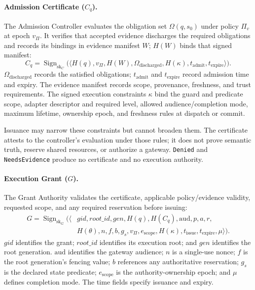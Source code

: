 \paragraph{Admission Certificate ($C_q$).}
The Admission Controller evaluates the obligation set $\Omega(q,s_0)$ under policy $\Pi_v$ at epoch $v_{\Pi}$. It verifies that accepted evidence discharges the required obligations and records its bindings in evidence manifest $W$; $H(W)$ binds that signed manifest:
\begin{equation}
C_q = \operatorname{Sign}_{\mathrm{sk}_C}\big(\langle H(q), v_{\Pi}, H(W),
\Omega_{\mathrm{discharged}}, H(\kappa), t_{\mathrm{admit}}, t_{\mathrm{expire}} \rangle\big).
\label{eq:cert-def}
\end{equation}
$\Omega_{\mathrm{discharged}}$ records the satisfied obligations; $t_{\mathrm{admit}}$ and $t_{\mathrm{expire}}$ record admission time and expiry. The evidence manifest records scope, provenance, freshness, and trust requirements. The signed execution constraints $\kappa$ bind the guard and predicate scope, adapter descriptor and required level, allowed audience/completion mode, maximum lifetime, ownership epoch, and freshness rules at dispatch or commit.

Issuance may narrow these constraints but cannot broaden them. The certificate attests to the controller's evaluation under those rules; it does not prove semantic truth, reserve shared resources, or authorize a gateway. \texttt{Denied} and \texttt{NeedsEvidence} produce no certificate and no execution authority.

\paragraph{Execution Grant ($G$).}
The Grant Authority validates the certificate, applicable policy/evidence validity, requested scope, and any required reservation before issuing:
\begin{equation}
\begin{split}
G = \operatorname{Sign}_{\mathrm{sk}_G}\big(\langle &gid, root\_id, gen, H(q), H(C_q), \mathrm{aud}, p, a, r,\\
&H(\theta), n, f, b, g_s, v_{\Pi}, e_{\mathrm{scope}}, H(\kappa), t_{\mathrm{issue}}, t_{\mathrm{expire}}, \mu \rangle\big).
\end{split}
\label{eq:grant-def}
\end{equation}
$gid$ identifies the grant; $root\_id$ identifies its execution root; and $gen$ identifies the root generation. $\mathrm{aud}$ identifies the gateway audience; $n$ is a single-use nonce; $f$ is the root generation's fencing value; $b$ references any authoritative reservation; $g_s$ is the declared state predicate; $e_{\mathrm{scope}}$ is the authority-ownership epoch; and $\mu$ defines completion mode. The time fields specify issuance and expiry.

